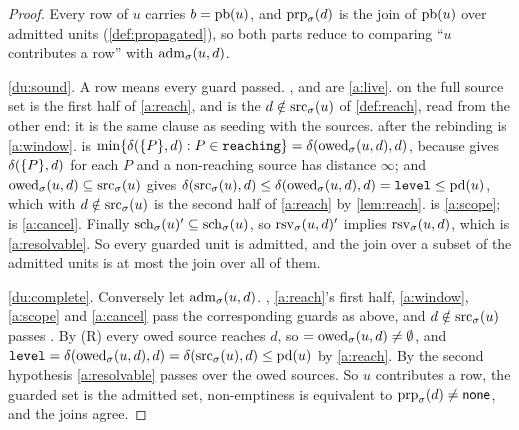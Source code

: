\begin{proof}
Every row of $u$ carries $b = \mathrm{pb}(u)$, and $\mathrm{prp}_{\sigma}(d)$ is the join of
$\mathrm{pb}(u)$ over admitted units (\cref{def:propagated}), so both parts reduce
to comparing ``$u$ contributes a row'' with $\mathrm{adm}_{\sigma}(u,d)$.

\ref{du:sound}. A row means every guard passed. ,
 and  are \cref{a:live}.  on the full source set is the first half of \cref{a:reach}, and
 is the $d \notin \mathrm{src}_{\sigma}(u)$ of \cref{def:reach}, read
from the other end: it is the same clause as seeding  with the
sources.  after the rebinding is \cref{a:window}.
 is $\min\{\delta(\{P\},d) : P \in \texttt{reaching}\} =
\delta(\mathrm{owed}_{\sigma}(u,d),d)$, because  gives
$\delta(\{P\},d)$ for each $P$ and a non-reaching source has distance
$\infty$; and $\mathrm{owed}_{\sigma}(u,d) \subseteq \mathrm{src}_{\sigma}(u)$ gives
$\delta(\mathrm{src}_{\sigma}(u),d) \leq \delta(\mathrm{owed}_{\sigma}(u,d),d) = \texttt{level} \leq
\mathrm{pd}(u)$, which with $d \notin \mathrm{src}_{\sigma}(u)$ is the second half of
\cref{a:reach} by \cref{lem:reach}. 
is \cref{a:scope};  is \cref{a:cancel}. Finally
$\mathrm{sch}_{\sigma}(u)' \subseteq \mathrm{sch}_{\sigma}(u)$, so $\mathrm{rsv}_{\sigma}(u,d)'$ implies
$\mathrm{rsv}_{\sigma}(u,d)$, which is \cref{a:resolvable}. So every guarded unit is
admitted, and the join over a subset of the admitted units is at most the join
over all of them.

\ref{du:complete}. Conversely let $\mathrm{adm}_{\sigma}(u,d)$. ,
\cref{a:reach}'s first half, \cref{a:window}, \cref{a:scope} and
\cref{a:cancel} pass the corresponding guards as above, and $d \notin
\mathrm{src}_{\sigma}(u)$ passes . By (R) every owed source reaches
$d$, so  $= \mathrm{owed}_{\sigma}(u,d) \neq \emptyset$, and
$\texttt{level} = \delta(\mathrm{owed}_{\sigma}(u,d),d) = \delta(\mathrm{src}_{\sigma}(u),d) \leq
\mathrm{pd}(u)$ by \cref{a:reach}. By the second hypothesis \cref{a:resolvable}
passes  over the owed sources. So $u$ contributes a row,
the guarded set is the admitted set, non-emptiness is equivalent to
$\mathrm{prp}_{\sigma}(d) \neq \mathsf{none}$, and the joins agree.
\end{proof}

